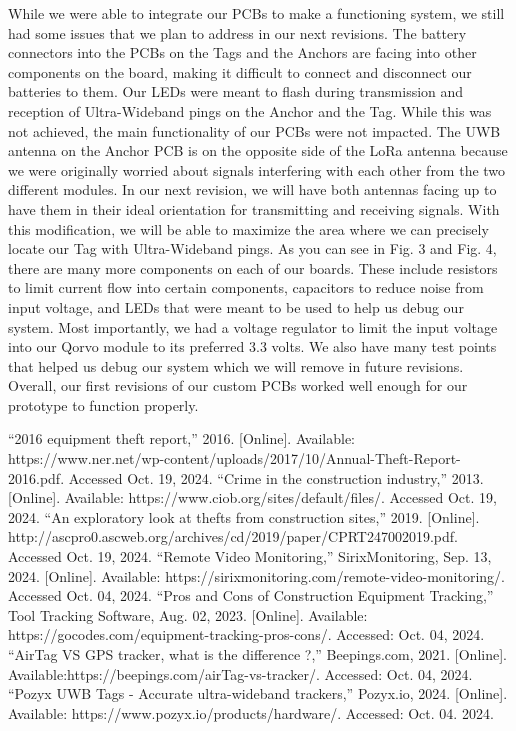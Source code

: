 \documentclass[conference]{IEEEtran}
\begin{document}
While we were able to integrate our PCBs to make a functioning system, we 
still had some issues that we plan to address in our next revisions. The 
battery connectors into the PCBs on the Tags and the Anchors are facing 
into other components on the board, making it difficult to connect and 
disconnect our batteries to them. Our LEDs were meant to flash during 
transmission and reception of Ultra-Wideband pings on the Anchor and the 
Tag. While this was not achieved, the main functionality of our PCBs were 
not impacted. The UWB antenna on the Anchor PCB is on the opposite side of 
the LoRa antenna because we were originally worried about signals interfering 
with each other from the two different modules. In our next revision, we will 
have both antennas facing up to have them in their ideal orientation for 
transmitting and receiving signals. With this modification, we will be able to 
maximize the area where we can precisely locate our Tag with Ultra-Wideband 
pings. As you can see in Fig. 3 and Fig. 4, there are many more components on 
each of our boards. These include resistors to limit current flow into certain 
components, capacitors to reduce noise from input voltage, and LEDs that were 
meant to be used to help us debug our system. Most importantly, we had a 
voltage regulator to limit the input voltage into our Qorvo module to its 
preferred 3.3 volts. We also have many test points that helped us debug our 
system which we will remove in future revisions. Overall, our first revisions 
of our custom PCBs worked well enough for our prototype to function properly.




\begin{thebibliography}{00}
 ``2016 equipment theft report,'' 2016. [Online]. Available: https://www.ner.net/wp-content/uploads/2017/10/Annual-Theft-Report-2016.pdf. Accessed Oct. 19, 2024.
 ``Crime in the construction industry,'' 2013. [Online]. Available: https://www.ciob.org/sites/default/files/. Accessed Oct. 19, 2024.
 ``An exploratory look at thefts from construction sites,'' 2019. [Online]. http://ascpro0.ascweb.org/archives/cd/2019/paper/CPRT247002019.pdf. Accessed Oct. 19, 2024.
 ``Remote Video Monitoring,'' SirixMonitoring, Sep. 13, 2024. [Online]. Available: https://sirixmonitoring.com/remote-video-monitoring/. Accessed Oct. 04, 2024.
 ``Pros and Cons of Construction Equipment Tracking,'' Tool Tracking Software, Aug. 02, 2023. [Online]. Available:  https://gocodes.com/equipment-tracking-pros-cons/. Accessed: Oct. 04, 2024.
 ``AirTag VS GPS tracker, what is the difference ?,'' Beepings.com, 2021. [Online]. Available:https://beepings.com/airTag-vs-tracker/. Accessed: Oct. 04, 2024.
 ``Pozyx UWB Tags - Accurate ultra-wideband trackers,'' Pozyx.io, 2024. [Online]. Available: https://www.pozyx.io/products/hardware/. Accessed: Oct. 04. 2024.
\end{thebibliography}
\vspace{12pt}
\end{document}

